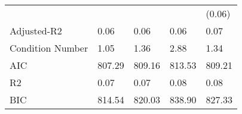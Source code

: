 \begin{table}
\begin{center}
\begin{tabular}{lllll}
                                               &         &         &         & (0.06)   \\
Adjusted-R2                                    & 0.06    & 0.06    & 0.06    & 0.07     \\
Condition Number                               & 1.05    & 1.36    & 2.88    & 1.34     \\
AIC                                            & 807.29  & 809.16  & 813.53  & 809.21   \\
R2                                             & 0.07    & 0.07    & 0.08    & 0.08     \\
BIC                                            & 814.54  & 820.03  & 838.90  & 827.33   \\
\hline
\end{tabular}
\end{center}
\end{table}